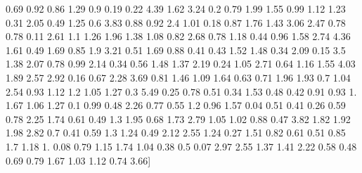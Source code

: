 \documentclass[preview]{standalone}
\begin{document}
\begin{center}
 0.69 0.92 0.86 1.29 0.9  0.19 0.22 4.39 1.62 3.24 0.2  0.79 1.99 1.55
 0.99 1.12 1.23 0.31 2.05 0.49 1.25 0.6  3.83 0.88 0.92 2.4  1.01 0.18
 0.87 1.76 1.43 3.06 2.47 0.78 0.78 0.11 2.61 1.1  1.26 1.96 1.38 1.08
 0.82 2.68 0.78 1.18 0.44 0.96 1.58 2.74 4.36 1.61 0.49 1.69 0.85 1.9
 3.21 0.51 1.69 0.88 0.41 0.43 1.52 1.48 0.34 2.09 0.15 3.5  1.38 2.07
 0.78 0.99 2.14 0.34 0.56 1.48 1.37 2.19 0.24 1.05 2.71 0.64 1.16 1.55
 4.03 1.89 2.57 2.92 0.16 0.67 2.28 3.69 0.81 1.46 1.09 1.64 0.63 0.71
 1.96 1.93 0.7  1.04 2.54 0.93 1.12 1.2  1.05 1.27 0.3  5.49 0.25 0.78
 0.51 0.34 1.53 0.48 0.42 0.91 0.93 1.   1.67 1.06 1.27 0.1  0.99 0.48
 2.26 0.77 0.55 1.2  0.96 1.57 0.04 0.51 0.41 0.26 0.59 0.78 2.25 1.74
 0.61 0.49 1.3  1.95 0.68 1.73 2.79 1.05 1.02 0.88 0.47 3.82 1.82 1.92
 1.98 2.82 0.7  0.41 0.59 1.3  1.24 0.49 2.12 2.55 1.24 0.27 1.51 0.82
 0.61 0.51 0.85 1.7  1.18 1.   0.08 0.79 1.15 1.74 1.04 0.38 0.5  0.07
 2.97 2.55 1.37 1.41 2.22 0.58 0.48 0.69 0.79 1.67 1.03 1.12 0.74 3.66]
\end{center}
\end{document}
